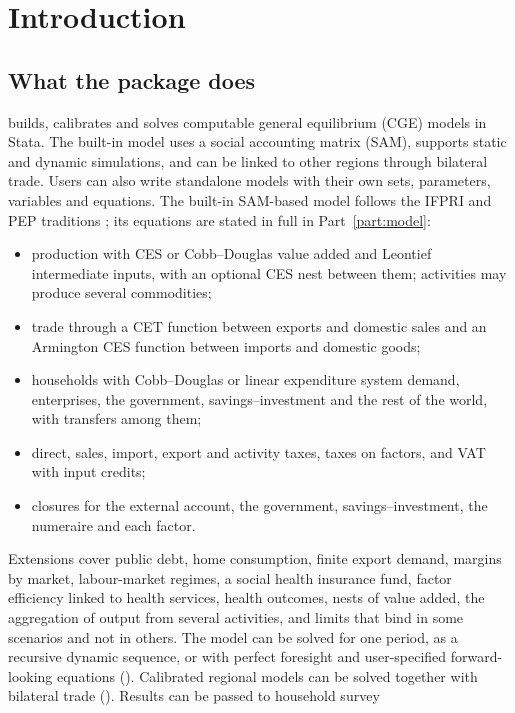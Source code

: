 \chapter{Introduction}\label{chap:intro}

\section{What the package does}

\pkg builds, calibrates and solves computable general equilibrium (CGE)
models in Stata. The built-in model uses a social accounting matrix (SAM),
supports static and dynamic simulations, and can be linked to other regions
through bilateral trade. Users can also write standalone models with their
own sets, parameters, variables and equations. The built-in SAM-based model
follows the IFPRI and PEP traditions \citep{lofgren2002,decaluwe2013}; its
equations are stated in full in Part~\ref{part:model}:
\begin{itemize}
\item production with CES or Cobb--Douglas value added and Leontief
intermediate inputs, with an optional CES nest between them; activities may
produce several commodities;
\item trade through a CET function between exports and domestic sales and an
Armington CES function between imports and domestic goods;
\item households with Cobb--Douglas or linear expenditure system demand,
enterprises, the government, savings--investment and the rest of the world,
with transfers among them;
\item direct, sales, import, export and activity taxes, taxes on factors, and
VAT with input credits;
\item closures for the external account, the government, savings--investment,
the numeraire and each factor.
\end{itemize}
Extensions cover public debt, home consumption, finite export demand, margins
by market, labour-market regimes, a social health insurance fund, factor
efficiency linked to health services, health outcomes, nests of value added,
the aggregation of output from several activities, and limits that bind in
some scenarios and not in others. The model can be solved for one period,
as a recursive dynamic sequence, or with perfect foresight and user-specified
forward-looking equations (). Calibrated regional models
can be solved together with bilateral trade ().
Results can be passed to household survey
